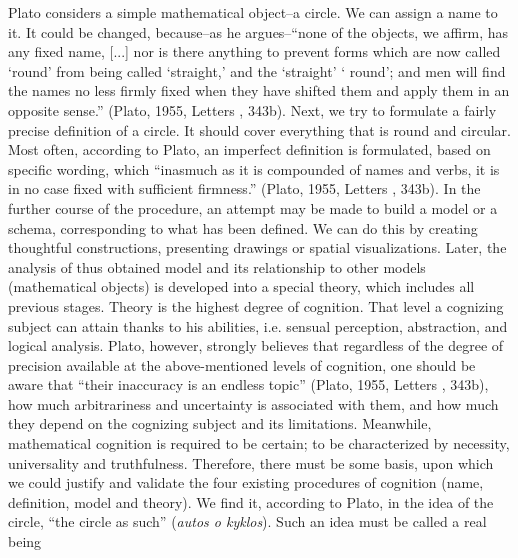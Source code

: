 \documentclass[a4paper]{article}
\begin{document}
Plato considers a simple mathematical object–a circle. We can assign a name to it. It could be changed, because–as he
argues–“none of the objects, we affirm, has any fixed name, [...] nor is there anything to prevent forms which are now
called ‘round’ from being called ‘straight,’ and the ‘straight’ ‘%
round’; and men will find the names no less firmly fixed when they have shifted them and apply them in an opposite
sense.” \label{ref:RNDS5RcrfAAN2}(Plato, 1955,  Letters , 343b). Next, we try to formulate a fairly precise definition
of a circle. It should cover everything that is round and circular. Most often, according to Plato, an imperfect
definition is formulated, based on specific wording, which “inasmuch as it is compounded of names and verbs, it is in
no case fixed with sufficient firmness.” \label{ref:RND4n4JdpjLkY}(Plato, 1955, Letters , 343b). In the further course
of the procedure, an attempt may be made to build a model or a schema, corresponding to what has been defined. We can
do this by creating thoughtful constructions, presenting drawings or spatial visualizations. Later, the analysis of
thus obtained model and its relationship to other models (mathematical objects) is developed into a special theory,
which includes all previous stages. Theory is the highest degree of cognition.  That level a cognizing subject can
attain thanks to his abilities, i.e. sensual perception, abstraction, and logical analysis. Plato, however, strongly
believes that regardless of the degree of precision available at the above-mentioned levels of cognition, one should be
aware that “their inaccuracy is an endless topic” \label{ref:RNDcxMLzs2MfW}(Plato, 1955,  Letters , 343b), how much
arbitrariness and uncertainty is associated with them, and how much they depend on the cognizing subject and its
limitations. Meanwhile, mathematical cognition is required to be certain; to be characterized by necessity,
universality and truthfulness. Therefore, there must be some basis, upon which we could justify and validate the four
existing procedures of cognition (name, definition, model and theory). We find it, according to Plato, in%
 the idea of the circle, “the circle as such” (\textit{autos o kyklos}). Such an idea must be called a real being
\end{document}
